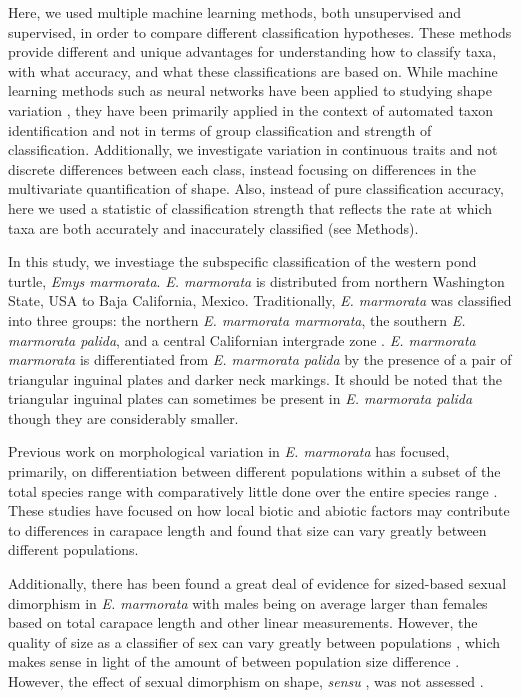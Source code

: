 \documentclass[12pt,letterpaper]{article}\usepackage{graphicx, color}
\begin{document}
Here, we used multiple machine learning methods, both unsupervised and supervised, in order to compare different classification hypotheses. These methods provide different and unique advantages for understanding how to classify taxa, with what accuracy, and what these classifications are based on. While machine learning methods such as neural networks have been applied to studying shape variation \citep{MacLeod2007}, they have been primarily applied in the context of automated taxon identification and not in terms of group classification and strength of classification. Additionally, we investigate variation in continuous traits and not discrete differences between each class, instead focusing on differences in the multivariate quantification of shape.
Also, instead of pure classification accuracy, here we used a statistic of classification strength that reflects the rate at which taxa are both accurately and inaccurately classified (see Methods).


In this study, we investiage the subspecific classification of the western pond turtle, \textit{Emys marmorata}. \textit{E. marmorata} is distributed from northern Washington State, USA to Baja California, Mexico.
Traditionally, \textit{E. marmorata} was classified into three groups: the northern \textit{E. marmorata marmorata}, the southern \textit{E. marmorata palida}, and a central Californian intergrade zone \citep{Seeliger1945}. \textit{E. marmorata marmorata} is differentiated from \textit{E. marmorata palida} by the presence of a pair of triangular inguinal plates and darker neck markings. It should be noted that the triangular inguinal plates can sometimes be present in \textit{E. marmorata palida} though they are considerably smaller.

Previous work on morphological variation in \textit{E. marmorata} has focused, primarily, on differentiation between different populations within a subset of the total species range \citep{Lubcke2007,Germano2009,Germano2008,Bury2010} with comparatively little done over the entire species range \citep{Holland1992}. These studies have focused on how local biotic and abiotic factors may contribute to differences in carapace length \citep{Lubcke2007,Germano2009,Germano2008} and found that size can vary greatly between different populations. 

Additionally, there has been found a great deal of evidence for sized-based sexual dimorphism in \textit{E. marmorata} \citep{Lubcke2007,Germano2009,Holland1992} with males being on average larger than females based on total carapace length and other linear measurements. However, the quality of size as a classifier of sex can vary greatly between populations \citep{Holland1992}, which makes sense in light of the amount of between population size difference \citep{Lubcke2007,Germano2009}. However, the effect of sexual dimorphism on shape, \textit{sensu} \citet{Kendall1977a}, was not assessed \citep{Holland1992,Lubcke2007,Germano2008}.
\end{document}
